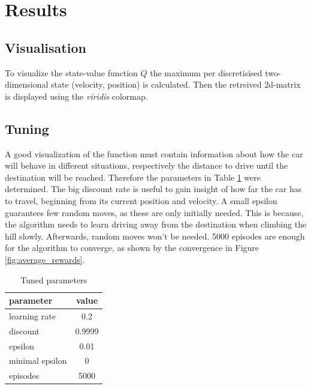 \documentclass{article}
\begin{document}
\section{Results}

\subsection{Visualisation}
To visualize the state-value function $Q$ the maximum per discretisised two-dimensional state (velocity, position) is calculated. Then the retreived 2d-matrix is displayed using the \textit{viridis} colormap.

\subsection{Tuning}
A good visualization of the function must contain information about how the car will behave in different situations, respectively the distance to drive until the destination will be reached. Therefore the parameters in Table \ref{tab:tuned_params} were determined. The big discount rate is useful to gain insight of how far the car has to travel, beginning from its current position and velocity. A small epsilon guarantees few random moves, as these are only initially needed. This is because, the algorithm needs to learn driving away from the destination when climbing the hill slowly. Afterwards, random moves won't be needed. 5000 episodes are enough for the algorithm to converge, as shown by the convergence in Figure \ref{fig:average_rewards}.


\begin{table}
    \centering
    \begin{tabular}{l|c}
        parameter & value \\
        \hline
        learning rate & 0.2 \\
        discount & 0.9999 \\
        epsilon & 0.01 \\
        minimal epsilon & 0 \\
        episodes & 5000 \\
    \end{tabular}
    \caption{Tuned parameters}
    \label{tab:tuned_params}
\end{table}
\end{document}
